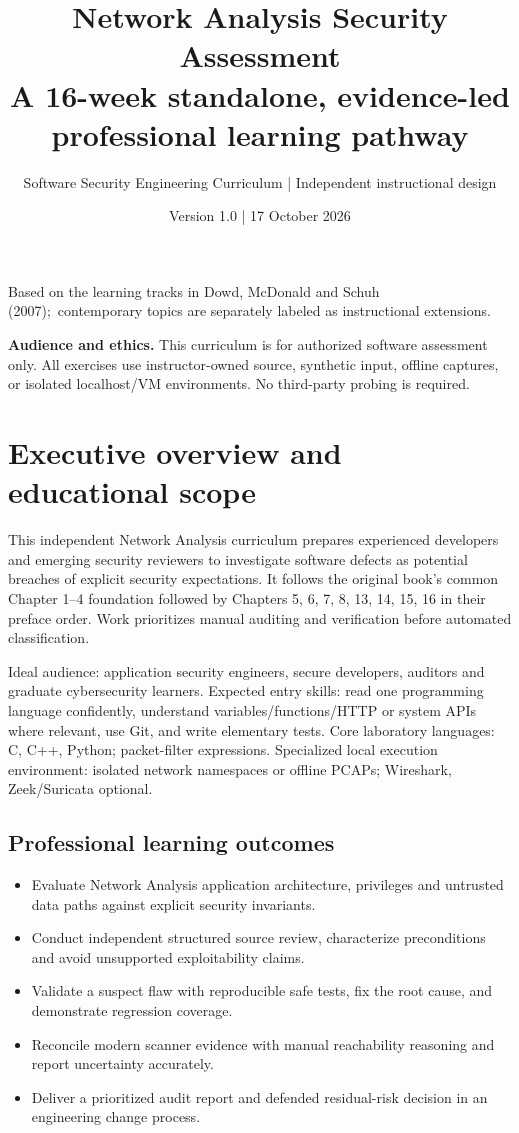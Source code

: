 \documentclass[10pt,letterpaper]{article}
\title{\vspace{-1.6cm}\Huge\color{navy}\bfseries Network Analysis Security Assessment\\[8pt]\large\color{teal}A 16-week standalone, evidence-led professional learning pathway}
\author{Software Security Engineering Curriculum | Independent instructional design}
\date{Version 1.0 | 17 October 2026}
\begin{document}
\maketitle
\begin{center}\small Based on the learning tracks in Dowd, McDonald and Schuh (2007);\
contemporary topics are separately labeled as instructional extensions.\end{center}
\begin{insight}\textbf{Audience and ethics.} This curriculum is for authorized software assessment only. All exercises use instructor-owned source, synthetic input, offline captures, or isolated localhost/VM environments. No third-party probing is required.\end{insight}
\tableofcontents
\clearpage
\section{Executive overview and educational scope}
This independent Network Analysis curriculum prepares experienced developers and emerging security reviewers to investigate software defects as potential breaches of explicit security expectations. It follows the original book's common Chapter 1--4 foundation followed by Chapters 5, 6, 7, 8, 13, 14, 15, 16 in their preface order. Work prioritizes manual auditing and verification before automated classification.

Ideal audience: application security engineers, secure developers, auditors and graduate cybersecurity learners. Expected entry skills: read one programming language confidently, understand variables/functions/HTTP or system APIs where relevant, use Git, and write elementary tests. Core laboratory languages: C, C++, Python; packet-filter expressions. Specialized local execution environment: isolated network namespaces or offline PCAPs; Wireshark, Zeek/Suricata optional.

\subsection{Professional learning outcomes}
\begin{itemize}[leftmargin=*,itemsep=2pt]
\item Evaluate Network Analysis application architecture, privileges and untrusted data paths against explicit security invariants.
\item Conduct independent structured source review, characterize preconditions and avoid unsupported exploitability claims.
\item Validate a suspect flaw with reproducible safe tests, fix the root cause, and demonstrate regression coverage.
\item Reconcile modern scanner evidence with manual reachability reasoning and report uncertainty accurately.
\item Deliver a prioritized audit report and defended residual-risk decision in an engineering change process.
\end{itemize}
\end{document}
